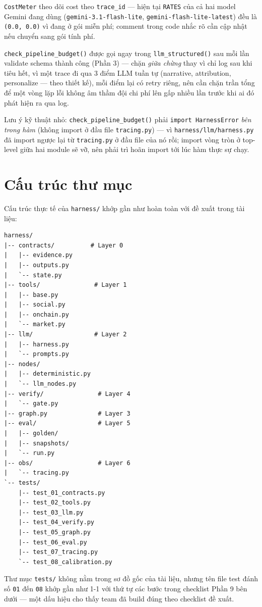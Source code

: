 \documentclass[12pt,a4paper]{article}
\newcommand{\file}[1]{\texttt{#1}}
\begin{document}
\texttt{CostMeter} theo dõi cost theo \texttt{trace\_id} --- hiện tại \texttt{RATES} của cả hai
model Gemini đang dùng (\texttt{gemini-3.1-flash-lite}, \texttt{gemini-flash-lite-latest}) đều là
\texttt{(0.0, 0.0)} vì đang ở gói miễn phí; comment trong code nhắc rõ cần cập nhật nếu chuyển
sang gói tính phí.

\texttt{check\_pipeline\_budget()} được gọi ngay trong \texttt{llm\_structured()} sau mỗi lần
validate schema thành công (Phần 3) --- chặn \emph{giữa chừng} thay vì chỉ log sau khi tiêu hết,
vì một trace đi qua 3 điểm LLM tuần tự (narrative, attribution, personalize --- theo thiết kế),
mỗi điểm lại có retry riêng, nên cần chặn trần tổng để một vòng lặp lỗi không âm thầm đội chi phí
lên gấp nhiều lần trước khi ai đó phát hiện ra qua log.

Lưu ý kỹ thuật nhỏ: \texttt{check\_pipeline\_budget()} phải \texttt{import HarnessError} \emph{bên
trong hàm} (không import ở đầu file \file{tracing.py}) --- vì \file{harness/llm/harness.py} đã
import ngược lại từ \file{tracing.py} ở đầu file của nó rồi; import vòng tròn ở top-level giữa hai
module sẽ vỡ, nên phải trì hoãn import tới lúc hàm thực sự chạy.

\section{Cấu trúc thư mục}

Cấu trúc thực tế của \file{harness/} khớp gần như hoàn toàn với đề xuất trong tài liệu:

\begin{lstlisting}
harness/
|-- contracts/          # Layer 0
|   |-- evidence.py
|   |-- outputs.py
|   `-- state.py
|-- tools/               # Layer 1
|   |-- base.py
|   |-- social.py
|   |-- onchain.py
|   `-- market.py
|-- llm/                 # Layer 2
|   |-- harness.py
|   `-- prompts.py
|-- nodes/
|   |-- deterministic.py
|   `-- llm_nodes.py
|-- verify/               # Layer 4
|   `-- gate.py
|-- graph.py              # Layer 3
|-- eval/                 # Layer 5
|   |-- golden/
|   |-- snapshots/
|   `-- run.py
|-- obs/                  # Layer 6
|   `-- tracing.py
`-- tests/
    |-- test_01_contracts.py
    |-- test_02_tools.py
    |-- test_03_llm.py
    |-- test_04_verify.py
    |-- test_05_graph.py
    |-- test_06_eval.py
    |-- test_07_tracing.py
    `-- test_08_calibration.py
\end{lstlisting}

Thư mục \file{tests/} không nằm trong sơ đồ gốc của tài liệu, nhưng tên file test đánh số
\texttt{01} đến \texttt{08} khớp gần như 1-1 với thứ tự các bước trong checklist Phần 9 bên dưới
--- một dấu hiệu cho thấy team đã build đúng theo checklist đề xuất.
\end{document}
